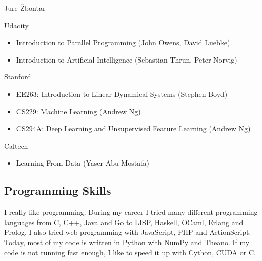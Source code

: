 \documentclass[12pt,a4paper]{article}
\begin{document}
\begin{cv}{Jure Žbontar}
\begin{cvlist}{}
\item[Udacity] 
\begin{itemize}
\item Introduction to Parallel Programming (John Owens, David Luebke)
\item Introduction to Artificial Intelligence (Sebastian Thrun, Peter Norvig)
\end{itemize}

\item[Stanford] 
\begin{itemize}
\item EE263: Introduction to Linear Dynamical Systems (Stephen Boyd)
\item CS229: Machine Learning (Andrew Ng)
\item CS294A: Deep Learning and Unsupervised Feature Learning (Andrew Ng)
\end{itemize}

\item[Caltech] 
\begin{itemize}
\item Learning From Data (Yaser Abu-Mostafa)
\end{itemize}

\end{cvlist}

\subsection*{Programming Skills}
I really like programming. During my career I tried many different programming
languages from C, C++, Java and Go to LISP, Haskell, OCaml, Erlang and Prolog.
I also tried web programming with JavaScript, PHP and ActionScript. Today, most
of my code is written in Python with NumPy and Theano. If my code is not
running fast enough, I like to speed it up with Cython, CUDA or C.

\end{cv}
\end{document}

